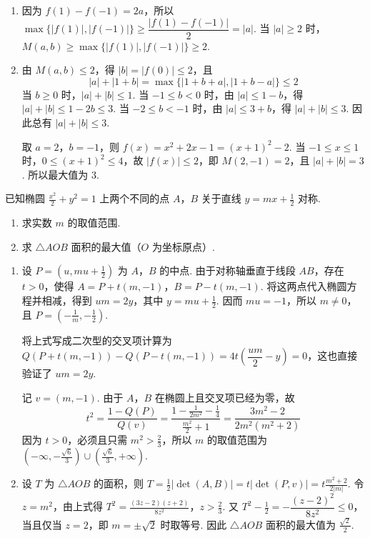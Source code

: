 \begin{solution}
\begin{enumerate}
\item 因为 \(f(1)-f(-1)=2a\)，所以
\(\max\{|f(1)|,|f(-1)|\}\geqslant\dfrac{|f(1)-f(-1)|}{2}=|a|\). 当 \(|a|\geqslant2\) 时，\(M(a,b)\geqslant\max\{|f(1)|,|f(-1)|\}\geqslant2\).

\item 由 \(M(a,b)\leqslant2\)，得 \(|b|=|f(0)|\leqslant2\)，且
\[
|a|+|1+b|=\max\{|1+b+a|,|1+b-a|\}\leqslant2
\]
当 \(b\geqslant0\) 时，\(|a|+|b|\leqslant1\). 当 \(-1\leqslant b<0\) 时，由 \(|a|\leqslant1-b\)，得 \(|a|+|b|\leqslant1-2b\leqslant3\). 当 \(-2\leqslant b<-1\) 时，由 \(|a|\leqslant3+b\)，得 \(|a|+|b|\leqslant3\). 因此总有 \(|a|+|b|\leqslant3\).

取 \(a=2\)，\(b=-1\)，则 \(f(x)=x^2+2x-1=(x+1)^2-2\). 当 \(-1\leqslant x\leqslant1\) 时，\(0\leqslant(x+1)^2\leqslant4\)，故 \(|f(x)|\leqslant2\)，即 \(M(2,-1)=2\)，且 \(|a|+|b|=3\). 所以最大值为 \(3\).
\end{enumerate}
\end{solution}

\begin{problem}
已知椭圆 \(\frac{x^2}{2} + y^2 = 1\) 上两个不同的点 \(A\)，\(B\) 关于直线 \(y = mx + \frac{1}{2}\) 对称.
\begin{enumerate}
\item 求实数 \(m\) 的取值范围.
\item 求 \( \triangle AOB \) 面积的最大值（\(O\) 为坐标原点）.
\end{enumerate}
\end{problem}

\begin{solution}
\begin{enumerate}
\item 设 \(P=(u,mu+\frac{1}{2})\) 为 \(A\)，\(B\) 的中点. 由于对称轴垂直于线段 \(AB\)，存在 \(t>0\)，使得
\(A=P+t(m,-1)\)，\(B=P-t(m,-1)\). 将这两点代入椭圆方程并相减，得到 \(um=2y\)，其中 \(y=mu+\frac{1}{2}\). 因而 \(mu=-1\)，所以 \(m\neq0\)，且
\(P=\left(-\frac{1}{m},-\frac{1}{2}\right)\).

将上式写成二次型的交叉项计算为
\(Q(P+t(m,-1))-Q(P-t(m,-1))=4t\left(\dfrac{um}{2}-y\right)=0\)，这也直接验证了 \(um=2y\).

记 \(v=(m,-1)\). 由于 \(A\)，\(B\) 在椭圆上且交叉项已经为零，故
\[
t^2=\frac{1-Q(P)}{Q(v)}=\frac{1-\frac{1}{2m^2}-\frac14}{\frac{m^2}{2}+1}=\frac{3m^2-2}{2m^2(m^2+2)}
\]
因为 \(t>0\)，必须且只需 \(m^2>\frac{2}{3}\)，所以 \(m\) 的取值范围为 \(\left(-\infty,-\frac{\sqrt{6}}{3}\right)\cup\left(\frac{\sqrt{6}}{3},+\infty\right)\).

\item 设 \(T\) 为 \(\triangle AOB\) 的面积，则
\(T=\frac12|\det(A,B)|=t|\det(P,v)|=t\frac{m^2+2}{2|m|}\). 令 \(z=m^2\)，由上式得
\(T^2=\frac{(3z-2)(z+2)}{8z^2}\)，\(z>\frac23\).
又 \(T^2-\frac12=-\dfrac{(z-2)^2}{8z^2}\leqslant0\)，当且仅当 \(z=2\)，即 \(m=\pm\sqrt{2}\) 时取等号. 因此 \(\triangle AOB\) 面积的最大值为 \(\frac{\sqrt{2}}{2}\).
\end{enumerate}
\end{solution}

